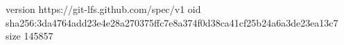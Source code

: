 version https://git-lfs.github.com/spec/v1
oid sha256:3da4764add23e4e28a270375ffc7e8a374f0d38ca41cf25b24a6a3de23ea13c7
size 145857
